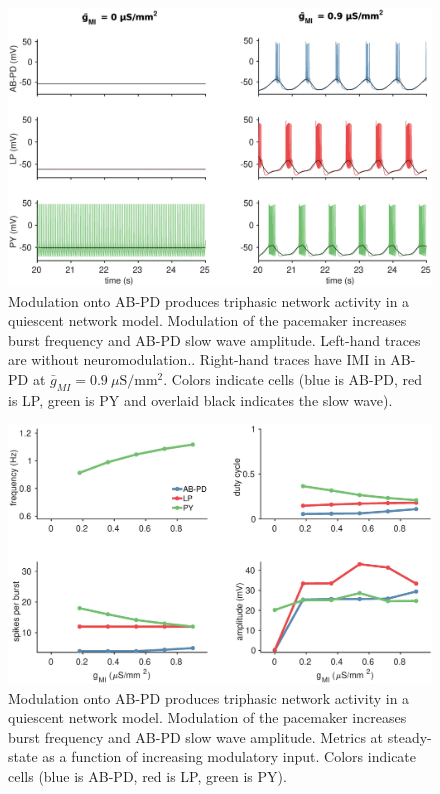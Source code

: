 \begin{figure}[h]
	\centering
	\includegraphics[width=1.0\linewidth]{gfx/network/network_AB_LP_14_traces}
	\caption[Network with modulation into AB-PD \& LP (traces)]{Modulation onto \acs{AB}-\acs{PD} produces triphasic network activity in a quiescent network model. Modulation of the pacemaker increases burst frequency and \acs{AB}-\acs{PD} slow wave amplitude. Left-hand traces are without neuromodulation.. Right-hand traces have \acs{IMI} in \acs{AB}-\acs{PD} at $\bar{g}_{MI} = 0.9~\mu \mathrm{S/mm^2}$. Colors indicate cells (blue is \acs{AB}-\acs{PD}, red is \acs{LP}, green is \acs{PY} and overlaid black indicates the slow wave).}
	\label{fig:networkablp14traces}
\end{figure}

\begin{figure}[h]
	\centering
	\includegraphics[width=1.0\linewidth]{gfx/network/network_AB_LP_14_metrics}
	\caption[Network with modulation into AB-PD \& LP (metrics)]{Modulation onto \acs{AB}-\acs{PD} produces triphasic network activity in a quiescent network model. Modulation of the pacemaker increases burst frequency and \acs{AB}-\acs{PD} slow wave amplitude. Metrics at steady-state as a function of increasing modulatory input. Colors indicate cells (blue is \acs{AB}-\acs{PD}, red is \acs{LP}, green is \acs{PY}).}
	\label{fig:networkablp14metrics}
\end{figure}

